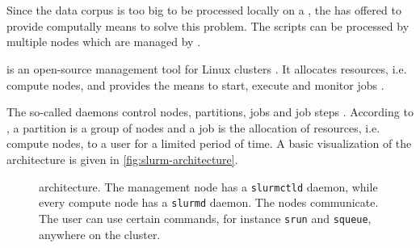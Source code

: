 
\section{\slurm{}}\label{subsec:slurm}

Since the data corpus is too big to be processed locally on a \localMaschineStats{}, the \thesisdepartment{} has offered to provide computally means to solve this problem.
The scripts can be processed by multiple nodes which are managed by \slurm{}.

\slurm{} is an open-source management tool for Linux clusters \cite{slurm-online}.
It allocates resources, i.e. compute nodes, and provides the means to start, execute and monitor jobs \cite{slurm-online, slurm2003}.

The so-called \slurm{} daemons control nodes, partitions, jobs and job steps \cite{slurm-online}.
According to \citeauthor{slurm-online}, a partition is a group of nodes and a job is the allocation of resources, i.e. compute nodes, to a user for a limited period of time.
A basic visualization of the architecture is given in \autoref{fig:slurm-architecture}.

\begin{figure}[htp] %
    \centering
    
    \caption[\slurm{} architecture]{\slurm{} architecture. The management node has a \texttt{slurmctld} daemon, while every compute node has a \texttt{slurmd} daemon.
    The nodes communicate.
    The user can use certain commands, for instance \texttt{srun} and \texttt{squeue}, anywhere on the cluster.
    }
    \label{fig:slurm-architecture}
\end{figure}